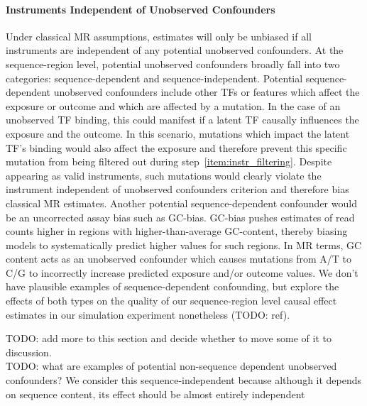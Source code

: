 \paragraph{Instruments Independent of Unobserved Confounders}%
\label{par:meth_instr_ind_conf}

Under classical MR assumptions, estimates will only be unbiased if all instruments are independent of any potential unobserved confounders. At the sequence-region level, potential unobserved confounders broadly fall into two categories: sequence-dependent and sequence-independent. Potential sequence-dependent unobserved confounders include other TFs or features which affect the exposure or outcome and which are affected by a mutation. In the case of an unobserved TF binding, this could manifest if a latent TF causally influences the exposure and the outcome. In this scenario, mutations which impact the latent TF's binding would also affect the exposure and therefore prevent this specific mutation from being filtered out during step~\ref{item:instr_filtering}. Despite appearing as valid instruments, such mutations would clearly violate the instrument independent of unobserved confounders criterion and therefore bias classical MR estimates. Another potential sequence-dependent confounder would be an uncorrected assay bias such as GC-bias. GC-bias pushes estimates of read counts higher in regions with higher-than-average GC-content, thereby biasing models to systematically predict higher values for such regions. In MR terms, GC content acts as an unobserved confounder which causes mutations from A/T to C/G to incorrectly increase predicted exposure and/or outcome values. We don't have plausible examples of sequence-dependent confounding, but explore the effects of both types on the quality of our sequence-region level causal effect estimates in our simulation experiment nonetheless (TODO: ref).


\noindent TODO: add more to this section and decide whether to move some of it to discussion.\\
TODO: what are examples of potential non-sequence dependent unobserved confounders? We consider this sequence-independent because although it depends on sequence content, its effect should be almost entirely independent 

